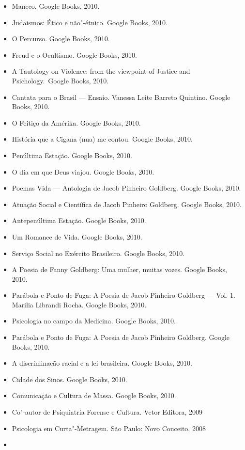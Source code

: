 \begin{itemize}
\item
  Maneco. Google Books, 2010.
\item
  Judaismos: Ético e não"-étnico. Google Books, 2010.
\item
  O Percurso. Google Books, 2010.
\item
  Freud e o Ocultismo. Google Books, 2010.
\item
  A Tautology on Violence: from the viewpoint of Justice and
  Psichology.~Google Books, 2010.
\item
  Cantata para o Brasil --- Ensaio. Vanessa Leite Barreto Quintino.
  Google Books, 2010.
\item
  O Feitiço da Amérika. Google Books, 2010.
\item
  História que a Cigana (nua) me contou. Google Books, 2010.
\item
  Penúltima Estação. Google Books, 2010.
\item
  O dia em que Deus viajou. Google Books, 2010.
\item
  Poemas Vida --- Antologia de Jacob Pinheiro Goldberg. Google Books,
  2010.
\item
  Atuação Social e Científica de Jacob Pinheiro Goldberg. Google Books,
  2010.
\item
  Antepenúltima Estação. Google Books, 2010.
\item
  Um Romance de Vida. Google Books, 2010.
\item
  Serviço Social no Exército Brasileiro. Google Books, 2010.
\item
  A Poesia de Fanny Goldberg: Uma mulher, muitas vozes. Google Books,
  2010.
\item
  Parábola e Ponto de Fuga: A Poesia de Jacob Pinheiro Goldberg --- Vol.
  1. Marilia Librandi Rocha. Google Books, 2010.
\item
  Psicologia no campo da Medicina. Google Books, 2010.
\item
  Parábola e Ponto de Fuga: A Poesia de Jacob Pinheiro Goldberg. Google
  Books, 2010.
\item
  A discriminacão racial e a lei brasileira. Google Books, 2010.
\item
  Cidade dos Sinos. Google Books, 2010.
\item
  Comunicação e Cultura de Massa. Google Books, 2010.
\item
  Co"-autor de Psiquiatria Forense e Cultura. Vetor Editora, 2009
\item
  Psicologia em Curta"-Metragem. São Paulo: Novo Conceito, 2008
\item

\end{itemize}
